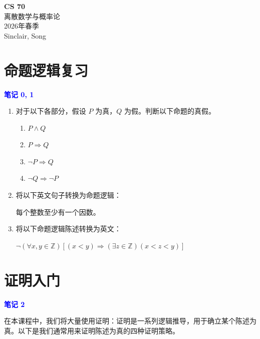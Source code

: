 \documentclass[11pt]{article}
\begin{document}
\begin{center}
{\Large\bfseries CS 70}\\[0.2em]
离散数学与概率论\\[0.1em]
2026年春季\\[0.1em]
Sinclair, Song\\[0.5em]
\end{center}

\section{命题逻辑复习}

\textcolor{blue}{\textbf{笔记 0, 1}}

\begin{enumerate}[label=(\alph*)]
\item 对于以下各部分，假设 $P$ 为真，$Q$ 为假。判断以下命题的真假。
\begin{enumerate}[label=(\roman*)]
\item $P \land Q$
\item $P \Rightarrow Q$
\item $\neg P \Rightarrow Q$
\item $\neg Q \Rightarrow \neg P$
\end{enumerate}

\item 将以下英文句子转换为命题逻辑：

每个整数至少有一个因数。

\item 将以下命题逻辑陈述转换为英文：

$\neg(\forall x,y \in \mathbb{Z})[(x < y) \Rightarrow (\exists z \in \mathbb{Z})(x < z < y)]$
\end{enumerate}

\section{证明入门}

\textcolor{blue}{\textbf{笔记 2}}

在本课程中，我们将大量使用证明：证明是一系列逻辑推导，用于确立某个陈述为真。以下是我们通常用来证明陈述为真的四种证明策略。
\end{document}
